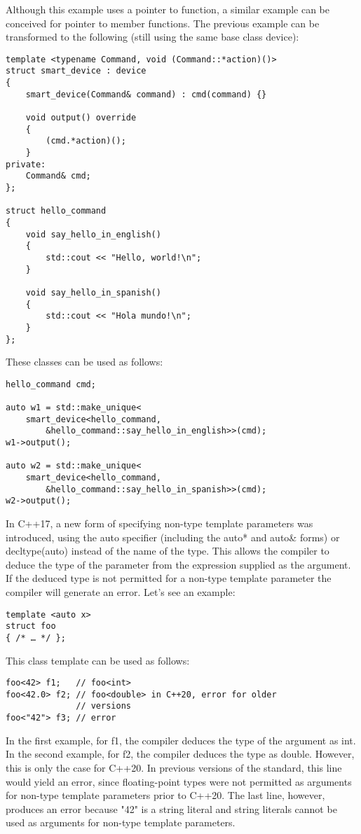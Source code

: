 Although this example uses a pointer to function, a similar example can be conceived for pointer to member functions. The previous example can be transformed to the following (still using the same base class device):

\begin{lstlisting}[style=styleCXX]
template <typename Command, void (Command::*action)()>
struct smart_device : device
{
	smart_device(Command& command) : cmd(command) {}
	
	void output() override
	{
		(cmd.*action)();
	}
private:
	Command& cmd;
};

struct hello_command
{
	void say_hello_in_english()
	{
		std::cout << "Hello, world!\n";
	}

	void say_hello_in_spanish()
	{
		std::cout << "Hola mundo!\n";
	}
};
\end{lstlisting}

These classes can be used as follows:

\begin{lstlisting}[style=styleCXX]
hello_command cmd;

auto w1 = std::make_unique<
	smart_device<hello_command,
		&hello_command::say_hello_in_english>>(cmd);
w1->output();

auto w2 = std::make_unique<
	smart_device<hello_command,
		&hello_command::say_hello_in_spanish>>(cmd);
w2->output();
\end{lstlisting}

In C++17, a new form of specifying non-type template parameters was introduced, using the auto specifier (including the auto* and auto\& forms) or decltype(auto) instead of the name of the type. This allows the compiler to deduce the type of the parameter from the expression supplied as the argument. If the deduced type is not permitted for a non-type template parameter the compiler will generate an error. Let's see an example:

\begin{lstlisting}[style=styleCXX]
template <auto x>
struct foo
{ /* … */ };
\end{lstlisting}

This class template can be used as follows:

\begin{lstlisting}[style=styleCXX]
foo<42> f1;   // foo<int>
foo<42.0> f2; // foo<double> in C++20, error for older
              // versions
foo<"42"> f3; // error
\end{lstlisting}

In the first example, for f1, the compiler deduces the type of the argument as int. In the second example, for f2, the compiler deduces the type as double. However, this is only the case for C++20. In previous versions of the standard, this line would yield an error, since floating-point types were not permitted as arguments for non-type template parameters prior to C++20. The last line, however, produces an error because "42" is a string literal and string literals cannot be used as arguments for non-type template parameters.

